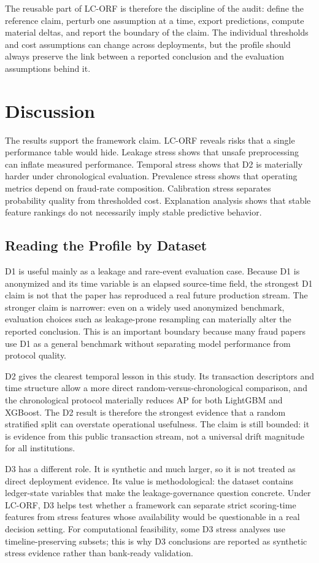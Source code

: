 \documentclass{ieeeaccess}
\begin{document}
The reusable part of LC-ORF is therefore the discipline of the audit: define the reference claim, perturb one assumption at a time, export predictions, compute material deltas, and report the boundary of the claim. The individual thresholds and cost assumptions can change across deployments, but the profile should always preserve the link between a reported conclusion and the evaluation assumptions behind it.

\FloatBarrier
\section{Discussion}
\label{sec:discussion}
The results support the framework claim. LC-ORF reveals risks that a single performance table would hide. Leakage stress shows that unsafe preprocessing can inflate measured performance. Temporal stress shows that D2 is materially harder under chronological evaluation. Prevalence stress shows that operating metrics depend on fraud-rate composition. Calibration stress separates probability quality from thresholded cost. Explanation analysis shows that stable feature rankings do not necessarily imply stable predictive behavior.

\subsection{Reading the Profile by Dataset}
D1 is useful mainly as a leakage and rare-event evaluation case. Because D1 is anonymized and its time variable is an elapsed source-time field, the strongest D1 claim is not that the paper has reproduced a real future production stream. The stronger claim is narrower: even on a widely used anonymized benchmark, evaluation choices such as leakage-prone resampling can materially alter the reported conclusion. This is an important boundary because many fraud papers use D1 as a general benchmark without separating model performance from protocol quality.

D2 gives the clearest temporal lesson in this study. Its transaction descriptors and time structure allow a more direct random-versus-chronological comparison, and the chronological protocol materially reduces AP for both LightGBM and XGBoost. The D2 result is therefore the strongest evidence that a random stratified split can overstate operational usefulness. The claim is still bounded: it is evidence from this public transaction stream, not a universal drift magnitude for all institutions.

D3 has a different role. It is synthetic and much larger, so it is not treated as direct deployment evidence. Its value is methodological: the dataset contains ledger-state variables that make the leakage-governance question concrete. Under LC-ORF, D3 helps test whether a framework can separate strict scoring-time features from stress features whose availability would be questionable in a real decision setting. For computational feasibility, some D3 stress analyses use timeline-preserving subsets; this is why D3 conclusions are reported as synthetic stress evidence rather than bank-ready validation.
\end{document}
